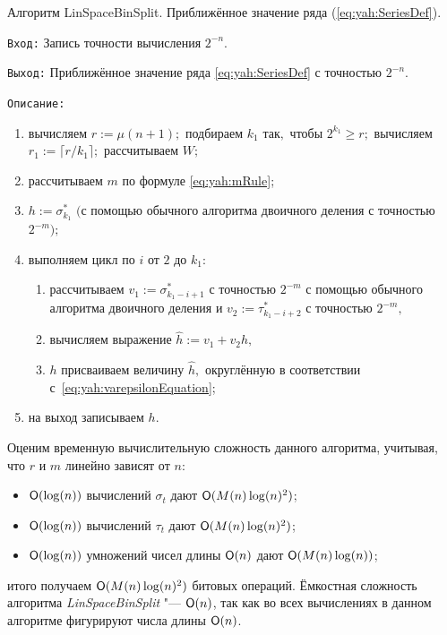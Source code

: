 {\small \sc Алгоритм LinSpaceBinSplit. Приближённое значение ряда (\ref{eq:yah:SeriesDef}).} 
\begin{description} \it 

\item{\tt Вход:} Запись точности вычисления $2^{-n}.$

\item{\tt Выход:} Приближённое значение ряда \eqref{eq:yah:SeriesDef}
с точностью $2^{-n}.$

\item{\tt Описание:}
%
\begin{enumerate}
\item[\rm 1)] вычисляем $r:=\mu(n+1);$ подбираем $k_1$ так$,$ чтобы $2^{k_1}\ge r;$ вычисляем $r_1:=\lceil{r}/{k_1}\rceil;$ рассчитываем $W;$
\item[\rm 2)] рассчитываем $m$ по формуле \rm \eqref{eq:yah:mRule}; \it 
\item[\rm 3)] $h:=\sigma_{k_1}^*$ $($с помощью обычного алгоритма двоичного деления с точностью $2^{-m});$
\item[\rm 4)] выполняем цикл по $i$ от $2$ до \rm $k_1$: \it 
\begin{enumerate}
\item[\rm а)] рассчитываем $v_1:=\sigma_{k_1-i+1}^*$ с точностью $2^{-m}$
с помощью обычного алгоритма двоичного деления и $v_2:=\tau_{k_1-i+2}^*$ с
точностью $2^{-m},$
\item[\rm б)] вычисляем выражение $\widehat h:=v_1+v_2 h,$
\item[\rm в)] $h$ присваиваем величину $\widehat h,$ округлённую в соответствии с~\rm \eqref{eq:yah:varepsilonEquation}; \it
\end{enumerate}
\item[\rm 5)] на выход записываем $h.$
\end{enumerate}

\end{description}

\smallskip

Оценим временную вычислительную сложность данного алгоритма,
учитывая, что $r$ и $m$ линейно зависят от $n$:
\begin{itemize}
\item{${\sf O}(\log(n))$ вычислений $\sigma_t$ дают ${\sf O}(M(n)\log(n)^2)$;}
\item{${\sf O}(\log(n))$ вычислений $\tau_t$ дают ${\sf O}(M(n)\log(n)^2)$;}
\item{${\sf O}(\log(n))$ умножений чисел длины ${\sf O}(n)$ дают
${\sf O}(M(n)\log(n))$;}
\end{itemize}
итого получаем ${\sf O}(M(n)\log(n)^2)$ битовых операций. Ёмкостная
сложность алгоритма {\itshape LinSpaceBinSplit} "--- ${\sf O}(n)$, так как во
всех вычислениях в данном алгоритме фигурируют числа длины ${\sf O}(n)$.

